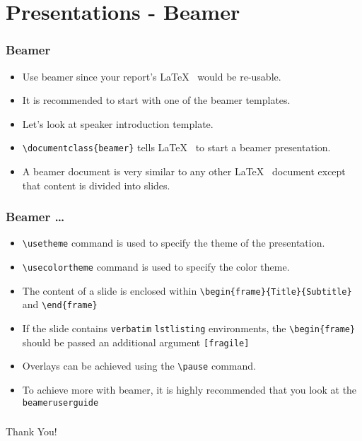 \documentclass{beamer}
\begin{document}
\section{Presentations - Beamer}
\begin{frame}[fragile]
  \frametitle{Beamer}
  \begin{itemize}
  \item Use beamer since your report's \LaTeX~ would be re-usable.
  \item It is recommended to start with one of the beamer templates.
  \item Let's look at speaker introduction template.
  \item \lstinline+\documentclass{beamer}+ tells \LaTeX~ to start a
    beamer presentation. 
  \item A beamer document is very similar to any other \LaTeX~
    document except that content is divided into slides. 
  \end{itemize}
\end{frame}

\begin{frame}[fragile]
  \frametitle{Beamer \ldots}
  \begin{itemize}
  \item \lstinline+\usetheme+ command is used to specify the theme of the
    presentation. 
  \item \lstinline+\usecolortheme+ command is used to specify the color
    theme. 
  \item The content of a slide is enclosed within
    \lstinline+\begin{frame}{Title}{Subtitle}+ and
    \lstinline+\end{frame}+ 
  \item If the slide contains \lstinline+verbatim+
    \lstinline+lstlisting+ environments, the \lstinline+\begin{frame}+
    should be passed an additional argument \lstinline+[fragile]+
  \item Overlays can be achieved using the \lstinline+\pause+
    command. 
  \item To achieve more with beamer, it is highly recommended that you
    look at the \texttt{beameruserguide} 
  \end{itemize}
\end{frame}

\begin{frame}[fragile]
  \frametitle{}
  \begin{center}
    \Huge{Thank You!}
  \end{center}
\end{frame}
\end{document}
